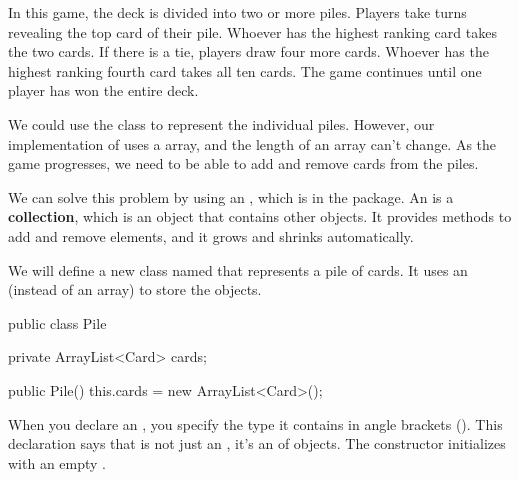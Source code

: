 In this game, the deck is divided into two or more piles.
Players take turns revealing the top card of their pile.
Whoever has the highest ranking card takes the two cards.
If there is a tie, players draw four more cards.
Whoever has the highest ranking fourth card takes all ten cards.
The game continues until one player has won the entire deck.

We could use the  class to represent the individual piles.
However, our implementation of  uses a  array, and the length of an array can't change.
As the game progresses, we need to be able to add and remove cards from the piles.


We can solve this problem by using an , which is in the  package.
An  is a {\bf collection}, which is an object that contains other objects.
It provides methods to add and remove elements, and it grows and shrinks automatically.



We will define a new class named  that represents a pile of cards.
It uses an  (instead of an array) to store the  objects.

\begin{code}
public class Pile {
    private ArrayList<Card> cards;

    public Pile() {
        this.cards = new ArrayList<Card>();
    }
}
\end{code}

\index{\textless\textgreater}

When you declare an , you specify the type it contains in angle brackets (\java{<>}).
This declaration says that  is not just an , it's an  of  objects.
The constructor initializes  with an empty .


